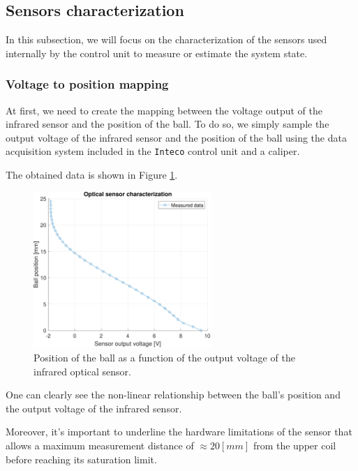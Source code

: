 \subsection{Sensors characterization}
\label{subsec:sensors_characterization}

In this subsection, we will focus on the characterization of the sensors used internally by the control unit to measure or estimate the system state.



\subsubsection{Voltage to position mapping}
\label{subsubsec:voltage_to_position}

At first, we need to create the mapping between the voltage output of the infrared sensor and the position of the ball.
To do so, we simply sample the output voltage of the infrared sensor and the position of the ball using the data acquisition system included in the \texttt{Inteco} control unit and a caliper.

The obtained data is shown in Figure \ref{fig:voltage_to_position}.

\begin{figure}[H]
    \centering
    \includegraphics[width=0.6\textwidth]{img/MATLAB/identification/sensor_position.pdf}
    \caption{Position of the ball as a function of the output voltage of the infrared optical sensor.}
    \label{fig:voltage_to_position}
\end{figure}

One can clearly see the non-linear relationship between the ball's position and the output voltage of the infrared sensor.

Moreover, it's important to underline the hardware limitations of the sensor that allows a maximum measurement distance of $\approx 20 [mm]$ from the upper coil before reaching its saturation limit.



